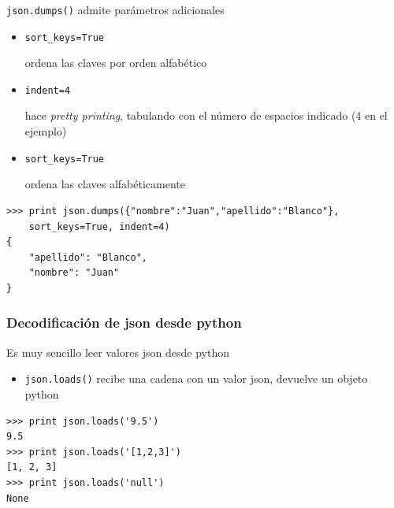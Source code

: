 \documentclass[ucs]{beamer}
\begin{document}
\begin{frame}[fragile]
\frametitle{}
\verb|json.dumps()| admite parámetros adicionales
\begin{itemize}
\item
\verb|sort_keys=True| 

ordena las claves por orden alfabético
\item
\verb|indent=4| 

hace \emph{pretty printing}, tabulando con el número de espacios indicado (4 en el ejemplo)
\item
\verb|sort_keys=True| 

ordena las claves alfabéticamente
\end{itemize}

  \begin{footnotesize}
  \begin{verbatim}
>>> print json.dumps({"nombre":"Juan","apellido":"Blanco"}, 
    sort_keys=True, indent=4)
{
    "apellido": "Blanco",
    "nombre": "Juan"
}
  \end{verbatim}
  \end{footnotesize}

\end{frame}


\begin{frame}[fragile]
\frametitle{Decodificación de json desde python}
Es muy sencillo leer valores json desde python
\begin{itemize}
\item
\verb|json.loads()| recibe una cadena con un valor json, devuelve un objeto python
\end{itemize}

  \begin{footnotesize}
  \begin{verbatim}
>>> print json.loads('9.5')
9.5
>>> print json.loads('[1,2,3]')
[1, 2, 3]
>>> print json.loads('null')
None
  \end{verbatim}
  \end{footnotesize}
\end{frame}
\end{document}
